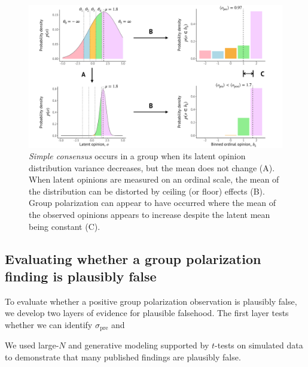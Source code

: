 \documentclass[11pt, letterpaper]{article}
\newcommand{\sigmapre}{\sigma_\mathrm{pre}}
\begin{document}
\begin{figure}
  \caption{\emph{Simple consensus} occurs in a group when its latent opinion
  distribution variance decreases, but the mean does not change (A). When 
latent opinions are measured on an ordinal scale, the mean of the distribution
can be distorted by ceiling (or floor) effects (B). Group polarization 
can appear to have occurred where the mean of the observed opinions appears
to increase despite the latent mean being constant (C).}
  \label{fig:consensusDistroIllustration}
  \vspace{1em}
  \centering
    \includegraphics[width=1.0\textwidth]{ConsensusDistroIllustration/figure.pdf}
\end{figure}



\subsection{Evaluating whether a group polarization finding is plausibly false}

To evaluate whether a positive group polarization observation is plausibly false,
we develop two layers of evidence for plausible falsehood. The first layer
tests whether we can identify $\sigmapre$ and 

We used large-$N$ and generative modeling supported by $t$-tests on simulated
data to demonstrate that many published findings are plausibly false. 
\end{document}
